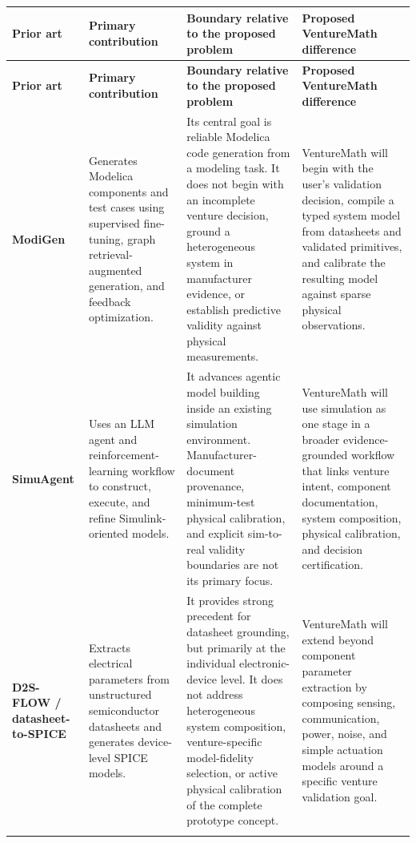 \documentclass[12pt,letterpaper]{article}
\begin{document}
\begingroup
\small
\setlength{\tabcolsep}{3pt}
\begin{longtable}{>{\raggedright\arraybackslash}p{2.5cm} >{\raggedright\arraybackslash}p{4.0cm} >{\raggedright\arraybackslash}p{4.0cm} >{\raggedright\arraybackslash}p{4.5cm}}
\toprule
\textbf{Prior art} & \textbf{Primary contribution} & \textbf{Boundary relative to the proposed problem} & \textbf{Proposed VentureMath difference} \\
\midrule
\endfirsthead
\toprule
\textbf{Prior art} & \textbf{Primary contribution} & \textbf{Boundary relative to the proposed problem} & \textbf{Proposed VentureMath difference} \\
\midrule
\endhead

\textbf{ModiGen} \cite{modigen}
& Generates Modelica components and test cases using supervised fine-tuning, graph retrieval-augmented generation, and feedback optimization.
& Its central goal is reliable Modelica code generation from a modeling task. It does not begin with an incomplete venture decision, ground a heterogeneous system in manufacturer evidence, or establish predictive validity against physical measurements.
& VentureMath will begin with the user's validation decision, compile a typed system model from datasheets and validated primitives, and calibrate the resulting model against sparse physical observations. \\
\addlinespace

\textbf{SimuAgent} \cite{simuagent}
& Uses an LLM agent and reinforcement-learning workflow to construct, execute, and refine Simulink-oriented models.
& It advances agentic model building inside an existing simulation environment. Manufacturer-document provenance, minimum-test physical calibration, and explicit sim-to-real validity boundaries are not its primary focus.
& VentureMath will use simulation as one stage in a broader evidence-grounded workflow that links venture intent, component documentation, system composition, physical calibration, and decision certification. \\
\addlinespace

\textbf{D2S-FLOW / datasheet-to-SPICE} \cite{d2sflow}
& Extracts electrical parameters from unstructured semiconductor datasheets and generates device-level SPICE models.
& It provides strong precedent for datasheet grounding, but primarily at the individual electronic-device level. It does not address heterogeneous system composition, venture-specific model-fidelity selection, or active physical calibration of the complete prototype concept.
& VentureMath will extend beyond component parameter extraction by composing sensing, communication, power, noise, and simple actuation models around a specific venture validation goal. \\
\addlinespace


\end{longtable}
\end{document}
